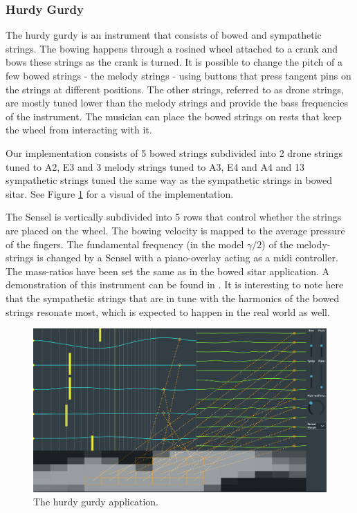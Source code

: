 \documentclass{article}
\begin{document}
\subsubsection{Hurdy Gurdy}
The hurdy gurdy is an instrument that consists of bowed and sympathetic strings. The bowing happens through a rosined wheel attached to a crank and bows these strings as the crank is turned. It is possible to change the pitch of a few bowed strings - the melody strings - using buttons that press tangent pins on the strings at different positions. The other strings, referred to as drone strings, are mostly tuned lower than the melody strings and provide the bass frequencies of the instrument. The musician can place the bowed strings on rests that keep the wheel from interacting with it. 

Our implementation consists of 5 bowed strings subdivided into 2 drone strings tuned to A2, E3 and 3 melody strings tuned to A3, E4 and A4 and 13 sympathetic strings tuned the same way as the sympathetic strings in bowed sitar. See Figure \ref{fig:hurdyGurdy} for a visual of the implementation.

The Sensel is vertically subdivided into 5 rows that control whether the strings are placed on the wheel. The bowing velocity is mapped to the average pressure of the fingers. The fundamental frequency (in the model $\gamma / 2$) of the melody-strings is changed by a Sensel with a piano-overlay acting as a midi controller. The mass-ratios have been set the same as in the bowed sitar application. A demonstration of this instrument can be found in \cite{video}. It is interesting to note here that the sympathetic strings that are in tune with the harmonics of the bowed strings resonate most, which is expected to happen in the real world as well.

\begin{figure}[h]
\centering
\includegraphics[width=1.0\columnwidth]{HurdyGurdy.png}
\caption{The hurdy gurdy application. \label{fig:hurdyGurdy}}
\end{figure}
\end{document}
